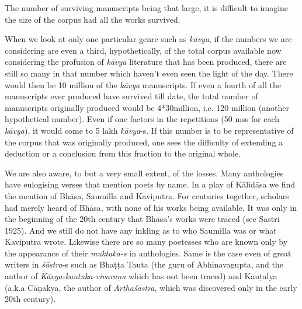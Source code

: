 The number of surviving manuscripts being that large, it is difficult to imagine the size of the corpus had all the works survived. 

When we look at only one particular genre such as {\sl kāvya}, if the numbers we are considering are even a third, hypothetically, of the total corpus available now considering the profusion of {\sl kāvya} literature that has been produced, there are still so many in that number which haven’t even seen the light of the day. There would then be 10 million of the {\sl kāvya} manuscripts. If even a fourth of all the manuscripts ever produced have survived till date, the total number of manuscripts originally produced would be 4*30million, i.e. 120 million (another hypothetical number). Even if one factors in the repetitions (50 mss for each {\sl kāvya}), it would come to 5 lakh {\sl kāvya}-s. If this number is to be representative of the corpus that was originally produced, one sees the difficulty of extending a deduction or a conclusion from this fraction to the original whole.

We are also aware, to but a very small extent, of the losses. Many anthologies have eulogising verses that mention poets by name. In a play of Kālidāsa we find the mention of Bhāsa, Saumilla and Kaviputra. For centuries together, scholars had merely heard of Bhāsa, with none of his works being available. It was only in the beginning of the 20th century that Bhāsa’s works were traced (see Sastri 1925). And we still do not have any inkling as to who Saumilla was or what Kaviputra wrote. Likewise there are so many poetesses who are known only by the appearance of their \hbox{{\sl muktaka-s}} in anthologies. Same is the case even of great writers in {\sl śāstra}-s such as Bhaṭṭa Tauta (the guru of Abhinavagupta, and the author of {\sl Kāvya-kautuka-vivaraṇa} which has not been traced) and Kauṭalya (a.k.a Cāṇakya, the author of {\sl Arthaśāstra}, which was discovered only in the early 20th century). 

